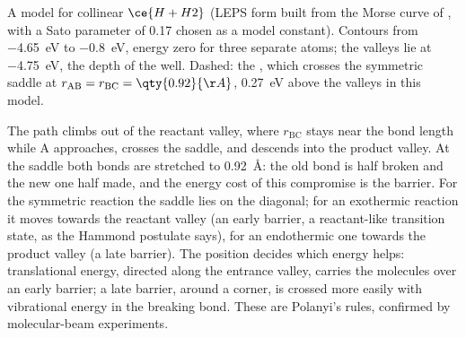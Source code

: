 \begin{omfigure}

{\small A model  for collinear $\ce{H + H2}$ (LEPS form built
from the Morse curve of , with a Sato parameter of 0.17 chosen as a model
constant). Contours from \qty{-4.65}{eV} to \qty{-0.8}{eV}, energy zero for three separate atoms;
the valleys lie at \qty{-4.75}{eV}, the depth of the  well. Dashed: the , which crosses the symmetric saddle at $r_{\mathrm{AB}} = r_{\mathrm{BC}} = \qty{0.92}{\AA}$,
\qty{0.27}{eV} above the valleys in this model.}
\end{omfigure}

The path climbs out of the reactant valley, where $r_{\mathrm{BC}}$ stays near the 
bond length while A approaches, crosses the saddle, and descends into the
product valley. At the saddle both bonds are stretched to \qty{0.92}{\AA}: the old
bond is half broken and the new one half made, and the energy cost of this
compromise is the barrier. For the symmetric reaction the saddle lies on the
diagonal; for an exothermic reaction it moves towards the reactant valley (an
early barrier, a reactant-like transition state, as the Hammond postulate
says), for an endothermic one towards the product valley (a late barrier).
The position decides which energy helps: translational energy, directed along
the entrance valley, carries the molecules over an early barrier; a late
barrier, around a corner, is crossed more easily with vibrational energy in the
breaking bond. These are Polanyi's rules, confirmed by molecular-beam
experiments.

